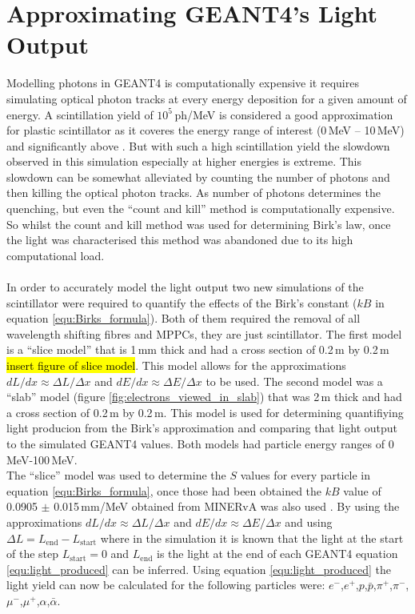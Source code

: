 \section{Approximating GEANT4's Light Output}\label{sec:geant4Simulation_MonteCarloBirksLaw}
Modelling photons in GEANT4 is computationally expensive it requires simulating optical photon tracks at every energy deposition for a given amount of energy. A scintillation yield of $10^5$\,ph/MeV is considered a good approximation for plastic scintillator as it coveres the energy range of interest (0\,MeV -- 10\,MeV) and significantly above \cite{craun_1970}. But with such a high scintillation yield the slowdown observed in this simulation especially at higher energies is extreme. This slowdown can be somewhat alleviated by counting the number of photons and then killing the optical photon tracks. As number of photons determines the quenching, but even the ``count and kill'' method is computationally expensive. So whilst the count and kill method was used for determining Birk's law, once the light was characterised this method was abandoned due to its high computational load.
\\\\In order to accurately model the light output two new simulations of the scintillator were required to quantify the effects of the Birk's constant ($kB$ in equation \ref{equ:Birks_formula}). Both of them required the removal of all wavelength shifting fibres and MPPCs, they are just scintillator. The first model is a ``slice model'' that is 1\,mm thick and had a cross section of 0.2\,m by 0.2\,m \hl{insert figure of slice model}. This model allows for the approximations $dL/dx \approx \Delta L / \Delta x$ and $dE/dx \approx \Delta E / \Delta x$ to be used. The second model was a ``slab'' model (figure \ref{fig:electrons_viewed_in_slab}) that was 2\,m thick and had a cross section of 0.2\,m by 0.2\,m. This model is used for determining quantifiying light producion from the Birk's approximation and comparing that light output to the simulated GEANT4 values. Both models had particle energy ranges of 0\,MeV-100\,MeV.
\\The ``slice'' model was used to determine the $S$ values for every particle in equation \ref{equ:Birks_formula}, once those had been obtained the $kB$ value of 0.0905 $\pm$ 0.015\,mm/MeV obtained from MINERvA was also used \cite{aliaga_2015}. By using the approximations $dL/dx \approx \Delta L / \Delta x$ and $dE/dx \approx \Delta E / \Delta x$ and using $\Delta L = L_{\textrm{end}} - L_{\textrm{start}} $ where in the simulation it is known that the light at the start of the step $L_{\textrm{start}} = 0$ and $L_{\textrm{end}}$ is the light at the end of each GEANT4 equation \ref{equ:light_produced} can be inferred. Using equation \ref{equ:light_produced} the light yield can now be calculated for the following particles were: $e^-$,$e^+$,$p$,$\bar{p}$,$\pi^+$,$\pi^-$,$\mu^-$,$\mu^+$,$\alpha$,$\bar{\alpha}$.

